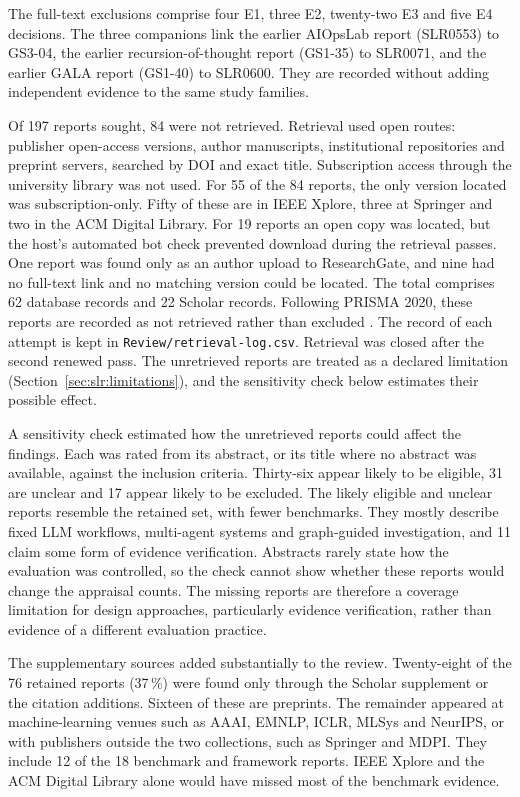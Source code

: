 The full-text exclusions comprise four E1, three E2, twenty-two E3 and five
E4 decisions. The three companions link the earlier AIOpsLab report
(SLR0553) to GS3-04, the earlier recursion-of-thought report (GS1-35) to
SLR0071, and the earlier GALA report (GS1-40) to SLR0600. They are recorded
without adding independent evidence to the same study families.

Of 197 reports sought, 84 were not retrieved. Retrieval used open routes:
publisher open-access versions, author manuscripts, institutional
repositories and preprint servers, searched by DOI and exact title.
Subscription access through the university library was not used. For 55
of the 84 reports, the only version located was subscription-only. Fifty
of these are in IEEE Xplore, three at Springer and two in the ACM Digital
Library. For 19 reports an open copy was located, but the host's automated
bot check prevented download during the retrieval passes. One report was
found only as an author upload to ResearchGate, and nine had no full-text
link and no matching version could be located. The total comprises 62
database records and 22 Scholar records. Following PRISMA 2020, these
reports are recorded as not retrieved rather than excluded
\parencite{page2021prisma}. The record of each attempt is kept in
\texttt{Review/retrieval-log.csv}.
Retrieval was closed after the second renewed pass. The unretrieved reports
are treated as a declared limitation (Section~\ref{sec:slr:limitations}),
and the sensitivity check below estimates their possible effect.

A sensitivity check estimated how the unretrieved reports could affect
the findings. Each was rated from its abstract, or its title where no
abstract was available, against the inclusion criteria. Thirty-six appear
likely to be eligible, 31 are unclear and 17 appear likely to be excluded.
The likely eligible and unclear reports resemble the retained set, with
fewer benchmarks. They mostly describe fixed LLM workflows, multi-agent
systems and graph-guided investigation, and 11 claim some form of evidence
verification. Abstracts
rarely state how the evaluation was controlled, so the check cannot show
whether these reports would change the appraisal counts. The missing
reports are therefore a coverage limitation for design approaches,
particularly evidence verification, rather than evidence of a different
evaluation practice.

The supplementary sources added substantially to the review. Twenty-eight
of the 76 retained reports (37\,\%) were found only through the Scholar
supplement or the citation additions. Sixteen of these are preprints. The
remainder appeared at machine-learning venues such as AAAI, EMNLP, ICLR,
MLSys and NeurIPS, or with publishers outside the two collections, such as
Springer and MDPI. They include 12 of the 18 benchmark and framework
reports. IEEE Xplore and the ACM Digital Library alone would have missed
most of the benchmark evidence.

